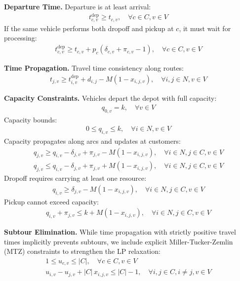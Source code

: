 \documentclass{article}
\begin{document}
\textbf{Departure Time.}
Departure is at least arrival:
\begin{align}
t^{\text{dep}}_{c,v} \ge t_{c,v},\quad \forall c\in C, v\in V
\end{align}
If the same vehicle performs both dropoff and pickup at $c$, it must wait for
processing:
\begin{align}
t^{\text{dep}}_{c,v} \ge t_{c,v} + p_c(\delta_{c,v}+\pi_{c,v}-1),
\quad \forall c\in C, v\in V
\end{align}

\textbf{Time Propagation.}
Travel time consistency along routes:
\begin{align}
t_{j,v} \ge t^{\text{dep}}_{i,v} + d_{i,j} - M(1-x_{i,j,v}),
\quad \forall i,j\in N, v\in V
\end{align}

\textbf{Capacity Constraints.}
Vehicles depart the depot with full capacity:
\begin{align}
q_{0,v} = k,\quad \forall v\in V
\end{align}
Capacity bounds:
\begin{align}
0 \le q_{i,v} \le k,\quad \forall i\in N, v\in V
\end{align}
Capacity propagates along arcs and updates at customers:
\begin{align}
q_{j,v} \ge q_{i,v} - \delta_{j,v} + \pi_{j,v} - M(1-x_{i,j,v}),
\quad \forall i\in N, j\in C, v\in V \\
q_{j,v} \le q_{i,v} - \delta_{j,v} + \pi_{j,v} + M(1-x_{i,j,v}),
\quad \forall i\in N, j\in C, v\in V
\end{align}
Dropoff requires carrying at least one resource:
\begin{align}
q_{i,v} \ge \delta_{j,v} - M(1-x_{i,j,v}),
\quad \forall i\in N, j\in C, v\in V
\end{align}
Pickup cannot exceed capacity:
\begin{align}
q_{i,v} + \pi_{j,v} \le k + M(1-x_{i,j,v}),
\quad \forall i\in N, j\in C, v\in V
\end{align}

\textbf{Subtour Elimination.}
While time propagation with strictly positive travel times implicitly prevents
subtours, we include explicit Miller-Tucker-Zemlin (MTZ) constraints to
strengthen the LP relaxation:
\begin{align}
1 \le u_{c,v} \le |C|,\quad \forall c\in C, v\in V \\
u_{i,v} - u_{j,v} + |C|\,x_{i,j,v} \le |C|-1,\quad \forall i,j\in C, i\ne j, v\in V
\end{align}
\end{document}
